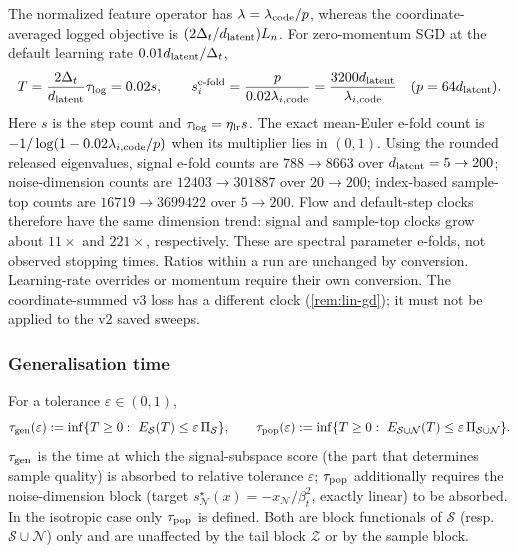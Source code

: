 \begin{remark}\label{rem:clock-p1}
The normalized feature operator has $\lambda=\lambda_{\rm code}/p$, whereas the coordinate-averaged logged objective is $(2\Delta_t/d_{\mathrm{latent}})L_{n}$. For zero-momentum SGD at the default learning rate $0.01d_{\mathrm{latent}}/\Delta_t$,
\[
T=\frac{2\Delta_t}{d_{\mathrm{latent}}}\tau_{\rm log}=0.02s,\qquad
s_i^{\rm e\text{-}fold}=\frac{p}{0.02\lambda_{i,\rm code}}
=\frac{3200d_{\mathrm{latent}}}{\lambda_{i,\rm code}}\quad(p=64d_{\mathrm{latent}}).
\]
Here $s$ is the step count and $\tau_{\rm log}=\eta_{\rm lr}s$. The exact mean-Euler e-fold count is $-1/\log(1-0.02\lambda_{i,\rm code}/p)$ when its multiplier lies in $(0,1)$. Using the rounded released eigenvalues, signal e-fold counts are $788\to8663$ over $d_{\mathrm{latent}}=5\to200$; noise-dimension counts are $12403\to301887$ over $20\to200$; index-based sample-top counts are $16719\to3699422$ over $5\to200$. Flow and default-step clocks therefore have the same dimension trend: signal and sample-top clocks grow about $11\times$ and $221\times$, respectively. These are spectral parameter e-folds, not observed stopping times. Ratios within a run are unchanged by conversion. Learning-rate overrides or momentum require their own conversion. The coordinate-summed v3 loss has a different clock (\cref{rem:lin-gd}); it must not be applied to the v2 saved sweeps.
\end{remark}

\subsubsection{Generalisation time}

\begin{definition}\label{def:taugen-p1}
For a tolerance $\varepsilon\in(0,1)$,
\[
\taugen(\varepsilon):=\inf\{T\ge0:\ E_{\mathcal S}(T)\le\varepsilon\,\Pi_{\mathcal S}\},\qquad
\tau_{\rm pop}(\varepsilon):=\inf\{T\ge0:\ E_{\mathcal S\cup\mathcal N}(T)\le\varepsilon\,\Pi_{\mathcal S\cup\mathcal N}\}.
\]
$\tau_{\mathrm{gen}}$ is the time at which the signal-subspace score (the part that determines sample quality) is absorbed to relative tolerance $\varepsilon$; $\tau_{\rm pop}$ additionally requires the noise-dimension block (target $s^\star_{\mathcal N}(x)=-x_{\mathcal N}/\beta_t^2$, exactly linear) to be absorbed. In the isotropic case only $\tau_{\rm pop}$ is defined. Both are block functionals of $\mathcal S$ (resp.\ $\mathcal S\cup\mathcal N$) only and are unaffected by the tail block $\mathcal Z$ or by the sample block.
\end{definition}

